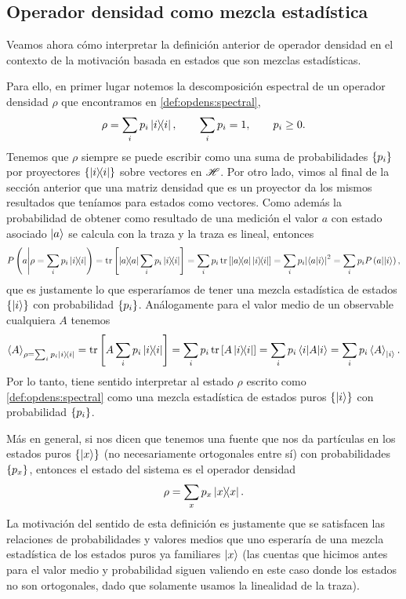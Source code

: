 \documentclass[10pt, a4paper]{article}
\numberwithin{equation}{subsection}
\begin{document}
\subsection{Operador densidad como mezcla estadística}
Veamos ahora cómo interpretar la definición anterior de operador densidad en el
contexto de la motivación basada en estados que son mezclas estadísticas.

Para ello, en primer lugar notemos la descomposición espectral de un operador
densidad $\rho$ que encontramos en \eqref{def:opdens:spectral},
\begin{equation}
  \rho = \sum_i p_i\projector{i}, \qquad \sum_i p_i = 1, \qquad p_i \geq 0.
\end{equation}
Tenemos que $\rho$ siempre se puede escribir como una suma de probabilidades
$\set{p_i}$ por proyectores $\set{\projector{i}}$ sobre vectores en
$\mathscr{H}$. Por otro lado, vimos al final de la sección anterior que una matriz
densidad que es un proyector da los mismos resultados que teníamos para estados
como vectores. Como además la probabilidad de obtener como resultado de una
medición el valor $a$ con estado asociado $\ket{a}$ se calcula con la traza y
la traza es lineal, entonces
\begin{equation}
  \ProbCond{a}{\rho = \sum_i p_i \projector{i}}
  = \tr\left[\projector{a} \sum_i p_i \projector{i}\right]
  = \sum_i p_i \tr\left[\projector{a} \projector{i}\right]
  = \sum_i p_i \abs{\braket{a}{i}}^2
  = \sum_i p_i \ProbCond{a}{\ket{i}},
\end{equation}
que es justamente lo que esperaríamos de tener una mezcla estadística de
estados $\set{\ket{i}}$ con probabilidad $\set{p_i}$. Análogamente para el
valor medio de un observable cualquiera $A$ tenemos
\begin{equation}
  \expval{A}_{\rho = \sum_i p_i \projector{i}}
  = \tr\left[A \sum_i p_i \projector{i}\right]
  = \sum_i p_i \tr\left[A \projector{i}\right]
  = \sum_i p_i \matrixel{i}{A}{i}
  = \sum_i p_i \expval{A}_{\ket{i}}.
\end{equation}
Por lo tanto, tiene sentido interpretar al estado $\rho$ escrito como
\eqref{def:opdens:spectral} como una mezcla estadística de estados puros
$\set{\ket{i}}$ con probabilidad $\set{p_i}$.

Más en general, si nos dicen que tenemos una fuente que nos da partículas en
los estados puros $\set{\ket{x}}$ (no necesariamente ortogonales entre sí) con
probabilidades $\set{p_x}$, entonces el estado del sistema es el operador
densidad
\begin{equation}
  \rho = \sum_{x} p_x\projector{x}.
\end{equation}
La motivación del sentido de esta definición es justamente que se satisfacen
las relaciones de probabilidades y valores medios que uno esperaría de una
mezcla estadística de los estados puros ya familiares $\ket{x}$ (las cuentas que
hicimos antes para el valor medio y probabilidad siguen valiendo en este caso
donde los estados no son ortogonales, dado que solamente usamos la linealidad
de la traza).
\end{document}
